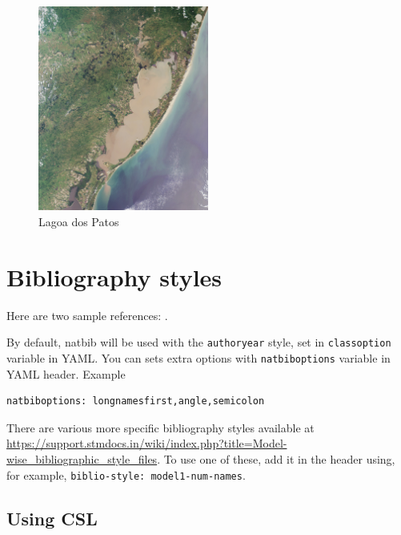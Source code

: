 \documentclass[
  super,
  preprint,
  3p]{elsarticle}
\begin{document}
\begin{figure}

{\centering \includegraphics[width=0.5\textwidth,height=\textheight]{Lagoa_dos_Patos.jpg}

}

\caption{Lagoa dos Patos}

\end{figure}

\hypertarget{bibliography-styles}{%
\section{Bibliography styles}\label{bibliography-styles}}

Here are two sample references: \citet{Feynman1963118} \citet{qin}.

By default, natbib will be used with the \texttt{authoryear} style, set
in \texttt{classoption} variable in YAML. You can sets extra options
with \texttt{natbiboptions} variable in YAML header. Example

\begin{verbatim}
natbiboptions: longnamesfirst,angle,semicolon
\end{verbatim}

There are various more specific bibliography styles available at
\url{https://support.stmdocs.in/wiki/index.php?title=Model-wise_bibliographic_style_files}.
To use one of these, add it in the header using, for example,
\texttt{biblio-style:\ model1-num-names}.

\hypertarget{using-csl}{%
\subsection{Using CSL}\label{using-csl}}
\end{document}
